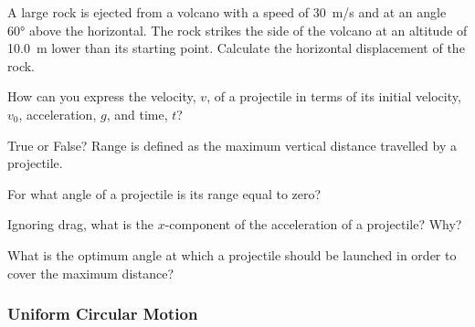 \documentclass[main.tex]{subfiles}
\begin{document}
\begin{exercise} \label{lhjg95}
    A large rock is ejected from a volcano with a speed of \SI{30}{m/s} and at an angle \ang{60} above the horizontal. The rock strikes the side of the volcano at an altitude of \SI{10.0}{m} lower than its starting point. Calculate the horizontal displacement of the rock.
\end{exercise}

\begin{exercise} \label{wlbvvu}
    How can you express the velocity, $v$, of a projectile in terms of its initial velocity, $v_0$, acceleration, $g$, and time, $t$?
\end{exercise}



\begin{exercise} \label{xj6gln}
    True or False? Range is defined as the maximum vertical distance travelled by a projectile. 
\end{exercise}

\begin{exercise} \label{5wfdN0}
    For what angle of a projectile is its range equal to zero?
\end{exercise}

\begin{exercise} \label{DnqDpu}
    Ignoring drag, what is the $x$-component of the acceleration of a projectile? Why?
\end{exercise}

\begin{exercise} \label{QsBUvP}
    What is the optimum angle at which a projectile should be launched in order to cover the maximum distance?
\end{exercise}

\subsubsection*{Uniform Circular Motion}
\end{document}
